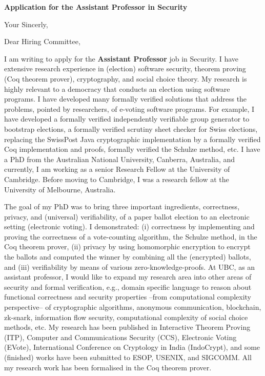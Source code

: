 \documentclass[11pt,a4paper,roman]{moderncv}
\begin{document}
\date{}
\opening{\textbf{Application for the Assistant Professor in Security}}
\closing{Your Sincerly, \vspace{-1em}}



\makelettertitle

Dear Hiring Committee, 

I am writing to apply
for the \textbf{Assistant Professor} job in Security. 
I have extensive research experience in
(election) software security, theorem proving (Coq theorem prover), cryptography,  
and social choice theory. My research is highly relevant to a democracy that conducts 
an election using software programs. I have developed many formally verified 
solutions that address the problems, pointed by researchers, 
of e-voting software programs. 
For example, I have developed a formally verified independently 
verifiable group generator to bootstrap elections, a formally verified 
scrutiny sheet checker for Swiss elections, replacing the SwissPost Java 
cryptographic implementation by a formally verified Coq implementation and proofs,  
formally verified the Schulze method, etc.
I have a PhD from the Australian National University, Canberra, Australia,
and currently, I am working as a senior Research Fellow at the University of 
Cambridge. Before moving to Cambridge, I was a 
research fellow at the University of Melbourne, Australia.



The goal of my PhD was to 
bring  three important ingredients, correctness, privacy, and (universal) verifiability, of a 
paper ballot election to an electronic setting (electronic voting). I 
demonstrated: (i) correctness by implementing and proving the correctness of 
a vote-counting algorithm, the Schulze method, in the Coq theorem prover, 
(ii) privacy by using homomorphic encryption to encrypt the ballots and computed
the winner by combining all the (encrypted) ballots, and 
(iii) verifiability by means of various zero-knowledge-proofs.
At UBC, as an assistant professor, 
I would like to expand my research area into other areas of 
security and formal verification, e.g., domain specific language to reason about 
functional correctness and security properties --from computational complexity perspective-- of 
cryptographic algorithms, anonymous communication, blockchain, zk-snark,  
information flow security, computational complexity of social choice methods, 
etc. My research has been published in Interactive Theorem Proving (ITP), 
Computer and Communications Security (CCS), Electronic Voting (EVote), 
International Conference on Cryptology in India (IndoCrypt),
and some (finished) works have been submitted to ESOP, USENIX, and SIGCOMM. 
All my research work has been formalised in the Coq theorem prover. 
\end{document}
